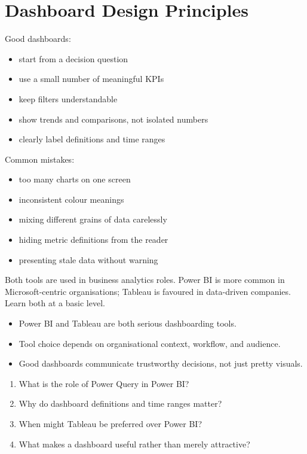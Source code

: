 \documentclass[12pt, a4paper, oneside]{book}
\begin{document}
\section{Dashboard Design Principles}

Good dashboards:
\begin{itemize}[leftmargin=2em]
    \item start from a decision question
    \item use a small number of meaningful KPIs
    \item keep filters understandable
    \item show trends and comparisons, not isolated numbers
    \item clearly label definitions and time ranges
\end{itemize}

Common mistakes:
\begin{itemize}[leftmargin=2em]
    \item too many charts on one screen
    \item inconsistent colour meanings
    \item mixing different grains of data carelessly
    \item hiding metric definitions from the reader
    \item presenting stale data without warning
\end{itemize}

\begin{tipbox}
Both tools are used in business analytics roles. Power BI is more common in Microsoft-centric organisations; Tableau is favoured in data-driven companies. Learn both at a basic level.
\end{tipbox}

\begin{summarybox}
\begin{itemize}[leftmargin=2em]
    \item Power BI and Tableau are both serious dashboarding tools.
    \item Tool choice depends on organisational context, workflow, and audience.
    \item Good dashboards communicate trustworthy decisions, not just pretty visuals.
\end{itemize}
\end{summarybox}

\begin{recallbox}
\begin{enumerate}[leftmargin=2em]
    \item What is the role of Power Query in Power BI?
    \item Why do dashboard definitions and time ranges matter?
    \item When might Tableau be preferred over Power BI?
    \item What makes a dashboard useful rather than merely attractive?
\end{enumerate}
\end{recallbox}
\end{document}

